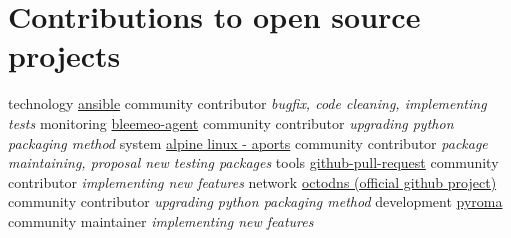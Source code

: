 \documentclass[]{friggeri-cv}
\begin{document}
\section{Contributions to open source projects}
\begin{entrylist}
    \entry
        {technology}
        {\href{https://github.com/ansible/ansible}{ansible}}
        {community contributor}
        {\emph{bugfix, code cleaning, implementing tests}}
    \entry
        {monitoring}
        {\href{https://github.com/bleemeo/bleemeo-agent}{bleemeo-agent}}
        {community contributor}
        {\emph{upgrading python packaging method}}
    \entry
        {system}
        {\href{https://github.com/alpinelinux/aports}{alpine linux - aports}}
        {community contributor}
        {\emph{package maintaining, proposal new testing packages}}
    \entry
        {tools}
        {\href{https://github.com/jd/git-pull-request}{github-pull-request}}
        {community contributor}
        {\emph{implementing new features}}
    \entry
        {network}
        {\href{https://github.com/github/octodns}{octodns (official github project)}}
        {community contributor}
        {\emph{upgrading python packaging method}}
    \entry
        {development}
        {\href{https://github.com/regebro/pyroma/}{pyroma}}
        {community maintainer}
        {\emph{implementing new features}}
\end{entrylist}


\newpage
\end{document}
